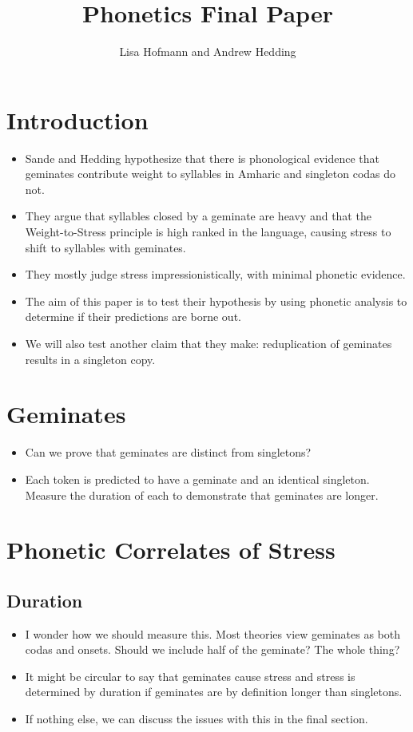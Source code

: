 \documentclass[12pt]{article}
\title{Phonetics Final Paper}
\author{Lisa Hofmann and Andrew Hedding}
\begin{document}
\maketitle
\section{Introduction}
\begin{itemize}
	\item Sande and Hedding hypothesize that there is phonological evidence that geminates contribute weight to syllables in Amharic and singleton codas do not.
	\item They argue that syllables closed by a geminate are heavy and that the Weight-to-Stress principle is high ranked in the language, causing stress to shift to syllables with geminates. 
	\item They mostly judge stress impressionistically, with minimal phonetic evidence. 
	\item The aim of this paper is to test their hypothesis by using phonetic analysis to determine if their predictions are borne out.
	\item We will also test another claim that they make: reduplication of geminates results in a singleton copy.	
\end{itemize}
\section{Geminates}
\begin{itemize}
\item Can we prove that geminates are distinct from singletons?
\item Each token is predicted to have a geminate and an identical singleton. Measure the duration of each to demonstrate that geminates are longer. 	
\end{itemize}

\section{Phonetic Correlates of Stress}
\subsection{Duration}
\begin{itemize}
\item I wonder how we should measure this. Most theories view geminates as both codas and onsets. Should we include half of the geminate? The whole thing? 
\item It might be circular to say that geminates cause stress and stress is determined by duration if geminates are by definition longer than singletons. 
\item If nothing else, we can discuss the issues with this in the final section. 	
\end{itemize}
\end{document}
